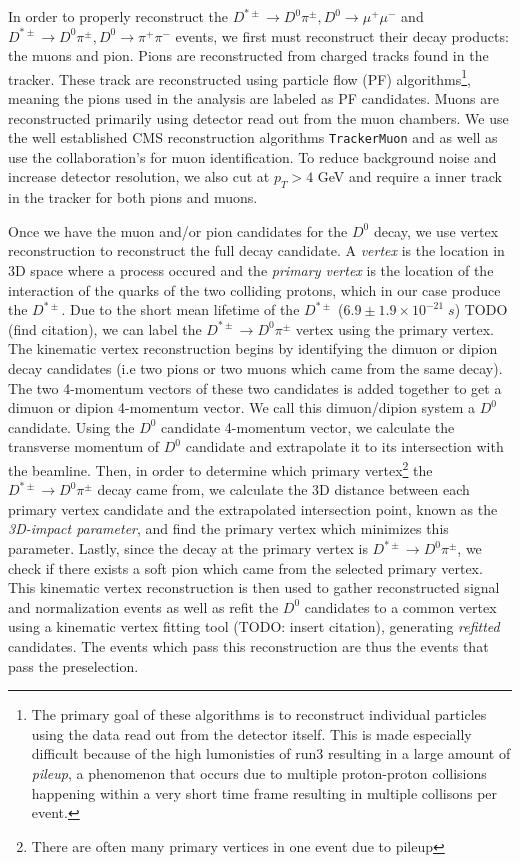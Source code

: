 In order to properly reconstruct the $D^{*\pm} \to D^0 \pi^\pm, D^0 \to \mu^+ \mu^-$ and $D^{*\pm} \to D^0 \pi^\pm, D^0 \to \pi^+ \pi^-$ events, we first must reconstruct their decay products: the muons and pion. Pions are reconstructed from charged tracks found in the tracker. These track are reconstructed using particle flow (PF) algorithms\footnote{The primary goal of these algorithms is to reconstruct individual particles using the data read out from the detector itself. This is made especially difficult because of the high lumonisties of run3 resulting in a large amount of \textit{pileup}, a phenomenon that occurs due to multiple proton-proton collisions happening within a very short time frame resulting in multiple collisons per event. }, meaning the pions used in the analysis are labeled as PF candidates. Muons are reconstructed primarily using detector read out from the muon chambers. We use the well established CMS reconstruction algorithms \texttt{TrackerMuon} and  as well as use the collaboration's  for muon identification. To reduce background noise and increase detector resolution, we also cut at $p_T>4$ GeV and require a  inner track in the tracker for both pions and muons.

Once we have the muon and/or pion candidates for the $D^0$ decay, we use vertex reconstruction to reconstruct the full decay candidate. A \textit{vertex} is the location in 3D space where a process occured and the \textit{primary vertex} is the location of the interaction of the quarks of the two colliding protons, which in our case produce the $D^{*\pm}$. Due to the short mean lifetime of the $D^{*\pm}$ ($ 6.9 \pm 1.9 \times 10^{-21} \; s$) TODO (find citation), we can label the $D^{*\pm} \to D^0 \pi^\pm$ vertex using the primary vertex. The kinematic vertex reconstruction begins by identifying the dimuon or dipion decay candidates (i.e two pions or two muons which came from the same decay). The two 4-momentum vectors of these two candidates is added together to get a dimuon or dipion 4-momentum vector. We call this dimuon/dipion system a $D^0$ candidate. Using the $D^0$ candidate 4-momentum vector, we calculate the transverse momentum of $D^0$ candidate and extrapolate it to its intersection with the beamline. Then, in order to determine which primary vertex\footnote{There are often many primary vertices in one event due to pileup} the $D^{*\pm} \to D^0 \pi^\pm$ decay came from, we calculate the 3D distance between each primary vertex candidate and the extrapolated intersection point, known as the \textit{3D-impact parameter}, and find the primary vertex which minimizes this parameter. Lastly, since the decay at the primary vertex is $D^{*\pm} \to D^0 \pi^\pm$, we check if there exists a soft pion which came from the selected primary vertex. This kinematic vertex reconstruction is then used to gather reconstructed signal and normalization events as well as refit the $D^0$ candidates to a common vertex using a kinematic vertex fitting tool (TODO: insert citation), generating \textit{refitted} candidates. The events which pass this reconstruction are thus the events that pass the preselection. 

